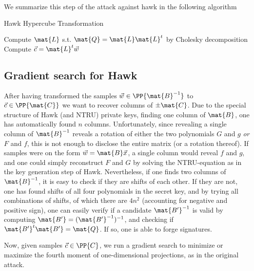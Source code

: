 We summarize this step of the attack against hawk in the following algorithm

\begin{algorithm}
\caption{Hawk Hypercube Transformation}
\begin{algorithmic}[1]
    \State Compute $\mat{L}$ s.t. $\mat{Q} = \mat{L}\mat{L}^t$ \Comment by Cholesky decomposition
    \State Compute $\vec{c} = \mat{L}^t \vec{w}$
    \State {}
\end{algorithmic}
\end{algorithm}

\subsection{Gradient search for Hawk}
After having transformed the samples $\vec{w} \in \PP{\mat{B}^{-1}}$ to $\vec{c} \in \PP{\mat{C}}$ we want to recover columns of $\pm \mat{C}$.
Due to the special structure of Hawk (and NTRU) private keys, finding one column of $\mat{B}$, one has automatically found $n$ columns.
Unfortunately, since revealing a single column of $ \mat{B}^{-1}$ reveals a rotation of either the two polynomials $G$ and $ g$ \textit{or} $F$ and $f$,
this is not enough to disclose the entire matrix (or a rotation thereof). If samples were on the form $\vec{w} = \mat{B} \vec{x}$, a single column would reveal $f$ and $g$, and one could simply reconstruct $F$ and $G$
by solving the NTRU-equation as in the key generation step of Hawk.
Nevertheless, if one finds two columns of $\mat{B}^{-1}$, it is easy to check if they are shifts of each other. If they are not, one has found shifts of all four polynomials in the secret key, 
and by trying all combinations of shifts, of which there are $4 n^2$ (accounting for negative and positive sign), one can easily verify if a candidate $\mat{B'}^{-1}$ is valid by computing 
$\mat{B'} = (\mat{B'}^{-1})^{-1}$, and checking if $\mat{B'}^t \mat{B'} = \mat{Q}$. If so, one is able to forge signatures.

Now, given samples $\vec{c} \in \PP{C}$, we run a gradient search to minimize or maximize the fourth moment of one-dimensional projections, as in the original attack.
